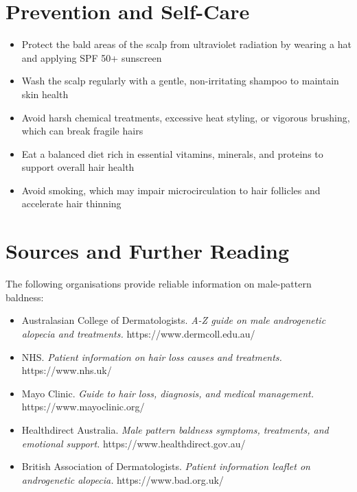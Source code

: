 \section*{Prevention and Self-Care}
\begin{itemize}
    \item Protect the bald areas of the scalp from ultraviolet radiation by wearing a hat and applying SPF 50+ sunscreen
    \item Wash the scalp regularly with a gentle, non-irritating shampoo to maintain skin health
    \item Avoid harsh chemical treatments, excessive heat styling, or vigorous brushing, which can break fragile hairs
    \item Eat a balanced diet rich in essential vitamins, minerals, and proteins to support overall hair health
    \item Avoid smoking, which may impair microcirculation to hair follicles and accelerate hair thinning
\end{itemize}

\section*{Sources and Further Reading}
The following organisations provide reliable information on male-pattern baldness:

\begin{itemize}
    \item Australasian College of Dermatologists. \textit{A-Z guide on male androgenetic alopecia and treatments.} https://www.dermcoll.edu.au/
    \item NHS. \textit{Patient information on hair loss causes and treatments.} https://www.nhs.uk/
    \item Mayo Clinic. \textit{Guide to hair loss, diagnosis, and medical management.} https://www.mayoclinic.org/
    \item Healthdirect Australia. \textit{Male pattern baldness symptoms, treatments, and emotional support.} https://www.healthdirect.gov.au/
    \item British Association of Dermatologists. \textit{Patient information leaflet on androgenetic alopecia.} https://www.bad.org.uk/
\end{itemize}
